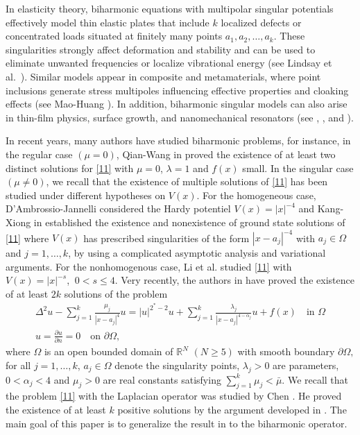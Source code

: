 \documentclass[10pt,a4paper]{amsart}
\numberwithin{equation}{section}
\begin{document}
In elasticity theory, biharmonic equations with multipolar singular potentials
effectively model thin elastic plates that include \(k\) localized defects or
concentrated loads situated at finitely many points \(a_1, a_2,\dots,a_k\).
These singularities strongly affect deformation and stability and can be used to
eliminate unwanted frequencies or localize vibrational energy
(see Lindsay et al.\ \cite{lin}). Similar models appear in composite and metamaterials, where point inclusions generate stress multipoles influencing effective properties and cloaking effects (see Mao-Huang \cite{met}). In addition, biharmonic singular models can also arise in thin-film physics, surface growth, and nanomechanical resonators (see \cite{ek}, \cite{g}, and \cite{gw}).

In recent years, many authors have studied biharmonic problems, for instance, in the regular case \((\mu=0)\), Qian-Wang in \cite{bh2} proved the existence of at least two distinct solutions for \eqref{11} with \(\mu=0\), \(\lambda=1\) and \(f(x)\) small. In the singular case \((\mu \neq 0)\), we recall that the existence of multiple solutions of \eqref{11} has been studied under different hypotheses on \(V(x)\). For the homogeneous case, D'Ambrossio-Jannelli \cite{j1} considered the Hardy potentiel \(V(x)=|x|^{-4}\) and Kang-Xiong in \cite{b5} established the existence and nonexistence of ground state solutions of \eqref{11} where \(V(x)\) has prescribed singularities of the form \(|x-a_j|^{-4}\) with \(a_j \in \Omega\) and \(j=1, \dots,k\), by using a complicated asymptotic analysis and variational arguments. For the nonhomogenous case, Li et al. \cite{bt} studied \eqref{11} with \(V(x)=|x|^{-s}\), \(\ 0<s\leq 4 \).
Very recently, the authors in \cite{ms} have proved the existence of at least \(2k\)
solutions of the problem
\begin{gather*}
\Delta^2u- \sum_{j=1}^{k} \frac{\mu_j}{|x-a_j|^4}u=|u|^{2^*-2}u
+\sum_{j=1}^{k} \frac{\lambda_j}{|x-a_j|^{4-\alpha_j}}u+ f(x) \quad \text{in }\Omega \\
u= \frac{\partial u}{\partial n}=0 \quad\text{on }\partial \Omega ,
\end{gather*}
where \(\Omega \) is an open bounded domain of
\( \mathbb{R} ^N\) \((N\geq 5)\) with smooth boundary \(\partial \Omega, \) for all
\(j=1, \dots ,k\), \(a_j\in \Omega\) denote the singularity points, \(\lambda_j>0\)
are parameters, \(0<\alpha_j<4\) and \(\mu_j>0\) are real constants satisfying
\(\sum_{j=1}^{k} \mu_j< \bar{\mu}\).
We recall that the problem \eqref{11} with the Laplacian operator was studied by
Chen \cite{c1}. He proved the existence of at least $k$ positive solutions by the
argument developed in \cite{t}. The main goal of this paper is to generalize the
result in \cite{c1} to the biharmonic operator.
\end{document}
